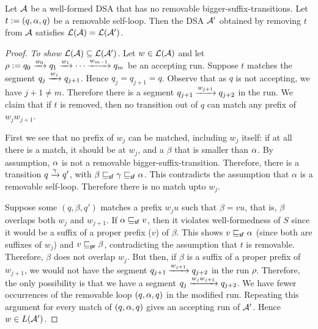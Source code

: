 \begin{lemma}
  \label{lem:removable-self-loop-redundant}
  Let $\mathcal{A}$ be a well-formed DSA that has no removable
  bigger-suffix-transitions. Let $t := (q, \alpha, q)$ be a removable
  self-loop. Then the DSA $\mathcal{A}'$ obtained by removing $t$ from $\mathcal{A}$
  satisfies $\mathcal{L}(\mathcal{A}) = \mathcal{L}(\mathcal{A}')$.
\end{lemma}
\begin{proof}
 \emph{To show $\mathcal{L}(\mathcal{A}) \subseteq \mathcal{L}(\mathcal{A}')$}. Let $w \in \mathcal{L}(\mathcal{A})$ and
  let $\rho:= q_0 \xrightarrow{w_0} q_1 \xrightarrow{w_1} \cdots \xrightarrow{w_{m-1}} q_m$ be
  an accepting run. Suppose $t$ matches the segment
  $q_j \xrightarrow{w_j} q_{j+1}$. Hence $q_j = q_{j+1} = q$.  Observe that as
  $q$ is not accepting, we have $j+1 \neq m$. Therefore there is a
  segment $q_{j+1} \xrightarrow{w_{j+1}} q_{j+2}$ in the run. We claim that if
  $t$ is removed, then no transition out of $q$ can match any prefix
  of $w_j w_{j+1}$.

  First we see that no prefix of $w_j$ can be
  matched, including $w_j$ itself: if at all there is a match, it
  should be at $w_j$, and a $\beta$ that is smaller than $\alpha$. By
  assumption, $\alpha$ is not a removable
  bigger-suffix-transition. Therefore, there is a transition $q
  \xrightarrow{\gamma} q'$, with $\beta \sqsubseteq_{\mathsf {sf}} \gamma \sqsubseteq_{\mathsf {sf}} \alpha$. This
  contradicts the assumption that $\alpha$ is a removable
  self-loop. Therefore there is no match upto $w_j$.

  Suppose some $(q, \beta, q')$
  matches a prefix $w_j u$ such that $\beta = v u$, that is, $\beta$
  overlaps both $w_j$ and $w_{j+1}$. If $\alpha \sqsubseteq_{\mathsf {sf}} v$, then it violates
  well-formedness of $S$ since it would be a suffix of a proper prefix
  ($v$) of $\beta$. This shows $v \sqsubseteq_{\mathsf {sf}} \alpha$ (since both are suffixes of
  $w_j$) and $v \sqsubseteq_{\mathsf {pr}} \beta$, contradicting the assumption that $t$ is
  removable. Therefore, $\beta$ does not overlap $w_j$. But then, if $\beta$
  is a suffix of a proper prefix of $w_{j+1}$, we would not have the
  segment $q_{j+1} \xrightarrow{w_{j+1}} q_{j+2}$ in the run
  $\rho$. Therefore, the only possibility is that we have a segment
  $q_j \xrightarrow{w_j w_{j+1}} q_{j+2}$. We have fewer occurrences of the
  removable loop $(q, \alpha, q)$ in the modified run. Repeating this
  argument for every match of $(q, \alpha, q)$ gives an accepting run of
  $\mathcal{A}'$. Hence $w \in L(\mathcal{A}')$.


\end{proof}
